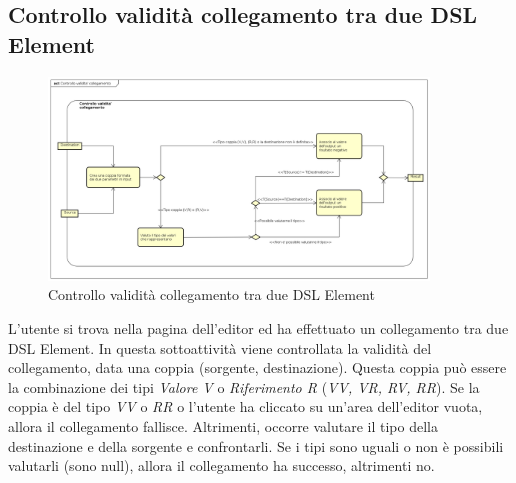     \subsection{Controllo validità collegamento tra due DSL Element}
    \begin{figure}[H]
      \centering
      \includegraphics[width=0.9\textwidth]{res/img/controlloCollegamento.png}
      \caption{Controllo validità collegamento tra due DSL Element}
      \label{fig:diagram_model}
    \end{figure}
L'utente si trova nella pagina dell'editor ed ha effettuato un collegamento tra due DSL Element. In questa sottoattività viene controllata la validità del collegamento, data una coppia (sorgente, destinazione). Questa coppia può essere la combinazione dei tipi \textit{Valore V} o \textit{Riferimento R} (\textit{VV, VR, RV, RR}). Se la coppia è del tipo \textit{VV} o \textit{RR} o l'utente ha cliccato su un'area dell'editor vuota, allora il collegamento fallisce. Altrimenti, occorre valutare il tipo della destinazione e della sorgente e confrontarli. Se i tipi sono uguali o non è possibili valutarli (sono null), allora il collegamento ha successo, altrimenti no. 
